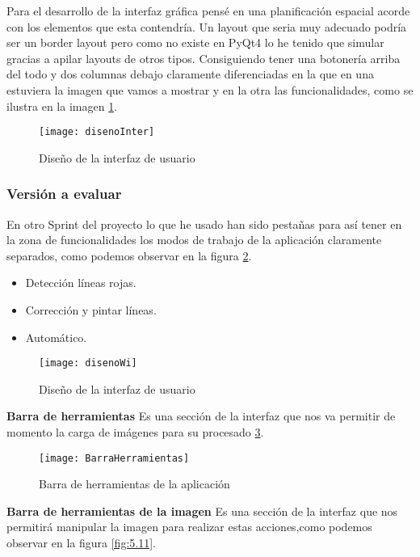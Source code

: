 Para el desarrollo de la interfaz gráfica pensé en una planificación espacial acorde con los elementos que esta contendría.
Un layout que seria muy adecuado podría ser un border layout pero como no existe en PyQt4 lo he tenido que simular gracias a apilar layouts de otros tipos.
Consiguiendo tener una botonería arriba del todo y dos columnas debajo claramente diferenciadas en la que en una estuviera la imagen que vamos a mostrar y en la otra las funcionalidades, como se ilustra en la imagen \ref{fig:5.8}.

\begin{figure}[h]
\centering
\texttt{[image: disenoInter]}
\caption{Diseño de la interfaz de usuario}
\label{fig:5.8}
\end{figure}

\subsubsection{Versión a evaluar}

En otro Sprint del proyecto lo que he usado han sido pestañas para así tener en la zona de funcionalidades los modos de trabajo de la aplicación claramente separados, como podemos observar en la figura \ref{fig:5.9}.

\begin{itemize}
\item Detección líneas rojas.
\item Corrección y pintar líneas.
\item Automático.
\end{itemize}


\begin{figure}[h]
\centering
\texttt{[image: disenoWi]}
\caption{Diseño de la interfaz de usuario}
\label{fig:5.9}
\end{figure}

\textbf{Barra de herramientas}
Es una sección de la interfaz que nos va permitir de momento la carga de imágenes para su procesado \ref{fig:5.10}.
\begin{figure}[h]
\centering
\texttt{[image: BarraHerramientas]}
\caption{Barra de herramientas de la aplicación}
\label{fig:5.10}
\end{figure}

\textbf{Barra de herramientas de la imagen}
Es una sección de la interfaz que nos permitirá manipular la imagen para realizar estas acciones,como podemos observar en la figura \ref{fig:5.11}.

